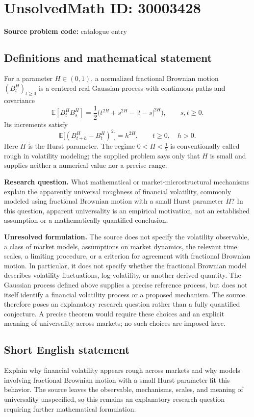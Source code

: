 \documentclass[11pt]{article}
\begin{document}
\section*{UnsolvedMath ID: 30003428}
\textbf{Source problem code:} catalogue entry
\subsection{Definitions and mathematical statement}
For a parameter \(H\in(0,1)\), a normalized fractional Brownian motion \((B_t^H)_{t\geq 0}\) is a centered real Gaussian process with continuous paths and covariance
\[
\mathbb{E}[B_t^H B_s^H]
=\frac12\bigl(t^{2H}+s^{2H}-|t-s|^{2H}\bigr),
\qquad s,t\geq0.
\]
Its increments satisfy
\[
\mathbb{E}\bigl[(B_{t+h}^H-B_t^H)^2\bigr]=h^{2H},
\qquad t\geq0,\quad h>0.
\]
Here \(H\) is the Hurst parameter. The regime \(0<H<\tfrac12\) is conventionally called rough in volatility modeling; the supplied problem says only that \(H\) is small and supplies neither a numerical value nor a precise range.

\textbf{Research question.} What mathematical or market-microstructural mechanisms explain the apparently universal roughness of financial volatility, commonly modeled using fractional Brownian motion with a small Hurst parameter \(H\)? In this question, apparent universality is an empirical motivation, not an established assumption or a mathematically quantified conclusion.

\textbf{Unresolved formulation.} The source does not specify the volatility observable, a class of market models, assumptions on market dynamics, the relevant time scales, a limiting procedure, or a criterion for agreement with fractional Brownian motion. In particular, it does not specify whether the fractional Brownian model describes volatility fluctuations, log-volatility, or another derived quantity. The Gaussian process defined above supplies a precise reference process, but does not itself identify a financial volatility process or a proposed mechanism. The source therefore poses an explanatory research question rather than a fully quantified conjecture. A precise theorem would require these choices and an explicit meaning of universality across markets; no such choices are imposed here.
\subsection{Short English statement}
Explain why financial volatility appears rough across markets and why models involving fractional Brownian motion with a small Hurst parameter fit this behavior. The source leaves the observable, mechanisms, scales, and meaning of universality unspecified, so this remains an explanatory research question requiring further mathematical formulation.
\end{document}
